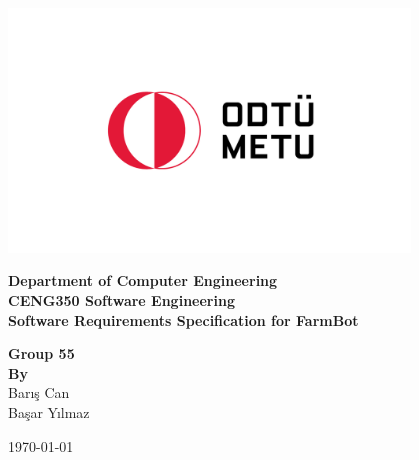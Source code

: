 \begin{titlepage}
   \begin{center}

       \includegraphics[width=0.8\textwidth]{Figures/metu_logo.png}
       \vspace{0.0cm}
     
            
        \textbf{\LARGE Department of  Computer Engineering} \\
        \vspace{0.5cm}
        \textbf{\LARGE CENG350 Software Engineering}\\
        \vspace{0.5cm} 
        \textbf{\LARGE Software Requirements Specification for FarmBot} \\
        \vspace{1.5cm} 
 

        \textbf{Group 55}\\
       \textbf{\textbf{By}} \\ Barış Can \\ Başar Yılmaz \\
       

       \vspace{1.5cm}
            
    
\vspace{0.5cm}
            


\today            
   \end{center}
\end{titlepage}